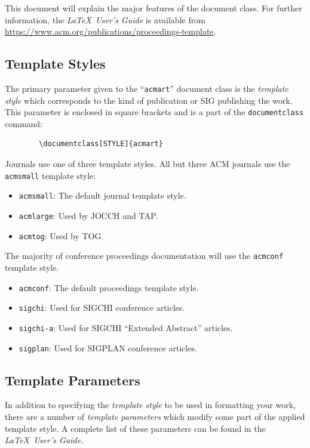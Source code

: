 \documentclass[acmlarge]{acmart}
\begin{document}
	This document will explain the major features of the document
	class. For further information, the {\itshape \LaTeX\ User's Guide} is
	available from
	\url{https://www.acm.org/publications/proceedings-template}.
	
	\subsection{Template Styles}
	
	The primary parameter given to the ``\verb|acmart|'' document class is
	the {\itshape template style} which corresponds to the kind of publication
	or SIG publishing the work. This parameter is enclosed in square
	brackets and is a part of the {\verb|documentclass|} command:
	\begin{verbatim}
		\documentclass[STYLE]{acmart}
	\end{verbatim}
	
	Journals use one of three template styles. All but three ACM journals
	use the {\verb|acmsmall|} template style:
	\begin{itemize}
		\item {\verb|acmsmall|}: The default journal template style.
		\item {\verb|acmlarge|}: Used by JOCCH and TAP.
		\item {\verb|acmtog|}: Used by TOG.
	\end{itemize}
	
	The majority of conference proceedings documentation will use the {\verb|acmconf|} template style.
	\begin{itemize}
		\item {\verb|acmconf|}: The default proceedings template style.
		\item{\verb|sigchi|}: Used for SIGCHI conference articles.
		\item{\verb|sigchi-a|}: Used for SIGCHI ``Extended Abstract'' articles.
		\item{\verb|sigplan|}: Used for SIGPLAN conference articles.
	\end{itemize}
	
	\subsection{Template Parameters}
	
	In addition to specifying the {\itshape template style} to be used in
	formatting your work, there are a number of {\itshape template parameters}
	which modify some part of the applied template style. A complete list
	of these parameters can be found in the {\itshape \LaTeX\ User's Guide.}
	
\end{document}
